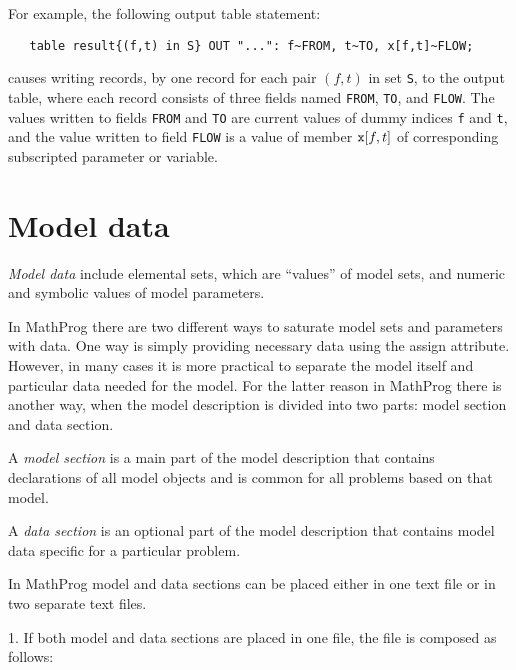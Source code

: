 \documentclass[10pt]{article}
\begin{document}
For example, the following output table statement:

\medskip

\noindent
\verb|   table result{(f,t) in S} OUT "...": f~FROM, t~TO, x[f,t]~FLOW;|

\medskip

\noindent
causes writing records, by one record for each pair $(f,t)$ in set
{\tt S}, to the output table, where each record consists of three
fields named {\tt FROM}, {\tt TO}, and {\tt FLOW}. The values written
to fields {\tt FROM} and {\tt TO} are current values of dummy indices
{\tt f} and {\tt t}, and the value written to field {\tt FLOW} is
a value of member ${\tt x}[f,t]$ of corresponding subscripted parameter
or variable.


\newpage

\section{Model data}

{\it Model data} include elemental sets, which are ``values'' of model
sets, and numeric and symbolic values of model parameters.

In MathProg there are two different ways to saturate model sets and
parameters with data. One way is simply providing necessary data using
the assign attribute. However, in many cases it is more practical to
separate the model itself and particular data needed for the model. For
the latter reason in MathProg there is another way, when the model
description is divided into two parts: model section and data section.

A {\it model section} is a main part of the model description that
contains declarations of all model objects and is common for all
problems based on that model.

A {\it data section} is an optional part of the model description that
contains model data specific for a particular problem.

In MathProg model and data sections can be placed either in one text
file or in two separate text files.

1. If both model and data sections are placed in one file, the file is
composed as follows:

\bigskip

\noindent\hfil
{}
\end{document}
